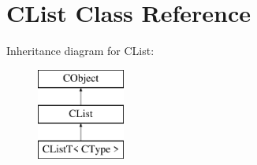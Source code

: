 \hypertarget{class_c_list}{\section{C\-List Class Reference}
\label{class_c_list}
}
Inheritance diagram for C\-List\-:\begin{figure}[H]
\begin{center}
\leavevmode
\includegraphics[height=3.000000cm]{class_c_list}
\end{center}
\end{figure}
